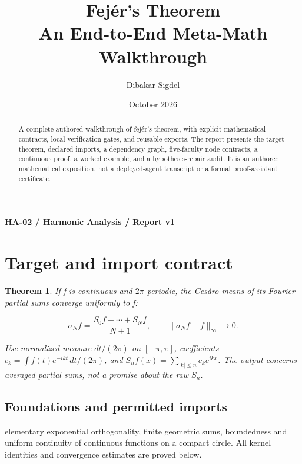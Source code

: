 \documentclass[preprint,12pt,aps,pra,showkeys,amsmath,amssymb,superscriptaddress,floatfix]{revtex4-2}
\newtheorem{theorem}{Theorem}[section]
\theoremstyle{definition}
\theoremstyle{remark}
\begin{document}
\title{Fejér's Theorem\\[4pt]\large An End-to-End Meta-Math Walkthrough}

\author{Dibakar Sigdel}


\date{October 2026}

\begin{abstract}

A complete authored walkthrough of fejér's theorem, with explicit
mathematical contracts, local verification gates, and reusable exports.
The report presents the target theorem, declared imports, a dependency
graph, five-faculty node contracts, a continuous proof, a worked
example, and a hypothesis-repair audit. It is an authored mathematical
exposition, not a deployed-agent transcript or a formal proof-assistant
certificate.

\end{abstract}\maketitle\linespread{1.12}\selectfont

\noindent\textbf{HA-02 / Harmonic Analysis / Report v1}

\section{Target and import contract}

\begin{theorem}

If f is continuous and \(2\pi\)-periodic, the Cesàro means of its
Fourier partial sums converge uniformly to f:

\[\sigma_N f=\frac{S_0f+\cdots+S_Nf}{N+1},\qquad\|\sigma_Nf-f\|_\infty\to0.\]

Use normalized measure \(dt/(2\pi)\) on \([-\pi ,\pi ]\), coefficients
\(c_k=\int f(t)e^{-ikt}\,dt/(2\pi)\), and
\(S_nf(x)=\sum_{|k|\le n}c_ke^{ikx}\). The output concerns averaged
partial sums, not a promise about the raw \(S_n\).

\end{theorem}

\subsection{Foundations and permitted imports}

elementary exponential orthogonality, finite geometric sums, boundedness
and uniform continuity of continuous functions on a compact circle. All
kernel identities and convergence estimates are proved below.
\end{document}
